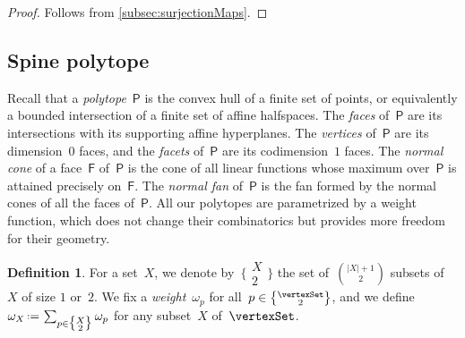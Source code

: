 \documentclass{amsart}
\theoremstyle{definition}
\newtheorem{definition}[theorem]{Definition}
\newcommand{\eqdef}{\mbox{\,\raisebox{0.2ex}{\scriptsize\ensuremath{\mathrm:}}\ensuremath{=}\,}} %
\newcommand{\darkblue}{\color{darkblue}} %
\newcommand{\defn}[1]{\textsl{\darkblue #1}} %
\newcommand{\vincent}[1]{\todo[color=blue!30]{#1 \\ \hfill --- V.}}
\newcommand{\polytope}[1]{\mathsf{#1}} %
\newcommand{\weight}{\omega} %
\newcommand{\monombinom}[1]{\big\{\!\begin{smallmatrix} #1 \\ 2 \end{smallmatrix}\!\big\}}
\begin{document}
\begin{proof}
  Follows from \cref{subsec:surjectionMaps}.
  \vincent{Say a bit more here.}
\end{proof}


\subsection{Spine polytope}
\label{subsec:spinePolytope}

Recall that a \defn{polytope}~$\polytope{P}$ is the convex hull of a finite set of points, or equivalently a bounded intersection of a finite set of affine halfspaces.
The \defn{faces} of~$\polytope{P}$ are its intersections with its supporting affine hyperplanes.
The \defn{vertices} of~$\polytope{P}$ are its dimension~$0$ faces, and the \defn{facets} of~$\polytope{P}$ are its codimension~$1$ faces.
The \defn{normal cone} of a face~$\polytope{F}$ of~$\polytope{P}$ is the cone of all linear functions whose maximum over~$\polytope{P}$ is attained precisely on~$\polytope{F}$.
The \defn{normal fan} of~$\polytope{P}$ is the fan formed by the normal cones of all the faces of~$\polytope{P}$.
All our polytopes are parametrized by a weight function, which does not change their combinatorics but provides more freedom for their geometry.

\begin{definition}
  \label{def:weight}
  For a set~$X$, we denote by~$\monombinom{X}$ the set of~$\binom{|X|+1}{2}$ subsets of~$X$ of size $1$ or~$2$.
  We fix a \defn{weight}~$\weight_p$ for all~$p \in \monombinom{\vertexSet}$, and we define~$\weight_X \eqdef \sum_{p \in \monombinom{X}} \weight_p$ for any subset~$X$ of~$\vertexSet$.
\end{definition}
\end{document}
